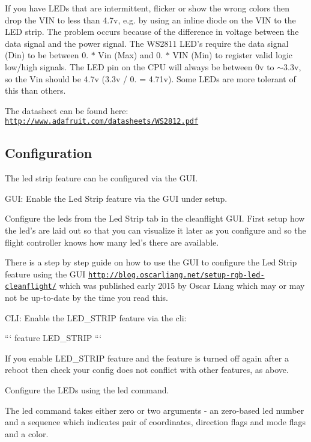 If you have L\+E\+Ds that are intermittent, flicker or show the wrong colors then drop the V\+I\+N to less than 4.\+7v, e.\+g. by using an inline diode on the V\+I\+N to the L\+E\+D strip. The problem occurs because of the difference in voltage between the data signal and the power signal. The W\+S2811 L\+E\+D's require the data signal (Din) to be between 0. $\ast$ Vin (Max) and 0. $\ast$ V\+I\+N (Min) to register valid logic low/high signals. The L\+E\+D pin on the C\+P\+U will always be between 0v to $\sim$3.3v, so the Vin should be 4.\+7v (3.\+3v / 0. = 4.\+71v). Some L\+E\+Ds are more tolerant of this than others.

The datasheet can be found here\+: \href{http://www.adafruit.com/datasheets/WS2812.pdf}{\tt http\+://www.\+adafruit.\+com/datasheets/\+W\+S2812.\+pdf}

\subsection*{Configuration}

The led strip feature can be configured via the G\+U\+I.

G\+U\+I\+: Enable the Led Strip feature via the G\+U\+I under setup.

Configure the leds from the Led Strip tab in the cleanflight G\+U\+I. First setup how the led's are laid out so that you can visualize it later as you configure and so the flight controller knows how many led's there are available.

There is a step by step guide on how to use the G\+U\+I to configure the Led Strip feature using the G\+U\+I \href{http://blog.oscarliang.net/setup-rgb-led-cleanflight/}{\tt http\+://blog.\+oscarliang.\+net/setup-\/rgb-\/led-\/cleanflight/} which was published early 2015 by Oscar Liang which may or may not be up-\/to-\/date by the time you read this.

C\+L\+I\+: Enable the {\ttfamily L\+E\+D\+\_\+\+S\+T\+R\+I\+P} feature via the cli\+:

``` feature L\+E\+D\+\_\+\+S\+T\+R\+I\+P ```

If you enable L\+E\+D\+\_\+\+S\+T\+R\+I\+P feature and the feature is turned off again after a reboot then check your config does not conflict with other features, as above.

Configure the L\+E\+Ds using the {\ttfamily led} command.

The {\ttfamily led} command takes either zero or two arguments -\/ an zero-\/based led number and a sequence which indicates pair of coordinates, direction flags and mode flags and a color.

